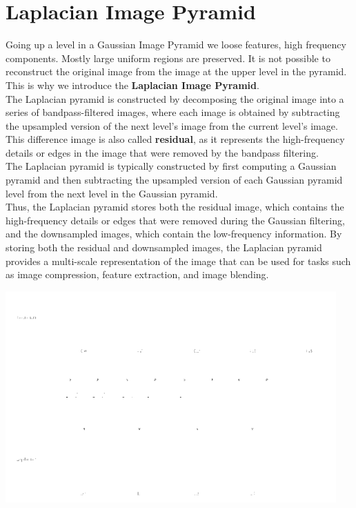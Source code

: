 \documentclass{article}
\begin{document}
\newpage

\section*{Laplacian Image Pyramid}

Going up a level in a Gaussian Image Pyramid we loose features, high frequency components. Mostly large uniform regions are preserved. It is not possible to reconstruct the original image from the image at the upper level in the pyramid. This is why we introduce the \textbf{Laplacian Image Pyramid}. \\

The Laplacian pyramid is constructed by decomposing the original image into a series of bandpass-filtered images, where each image is obtained by subtracting the upsampled version of the next level's image from the current level's image. This difference image is also called \textbf{residual}, as it represents the high-frequency details or edges in the image that were removed by the bandpass filtering. \\

The Laplacian pyramid is typically constructed by first computing a Gaussian pyramid and then subtracting the upsampled version of each Gaussian pyramid level from the next level in the Gaussian pyramid. \\

Thus, the Laplacian pyramid stores both the residual image, which contains the high-frequency details or edges that were removed during the Gaussian filtering, and the downsampled images, which contain the low-frequency information. By storing both the residual and downsampled images, the Laplacian pyramid provides a multi-scale representation of the image that can be used for tasks such as image compression, feature extraction, and image blending.

\begin{center}
\includegraphics[width=0.95\textwidth]{images/pyramids.png}
\end{center}
\end{document}

